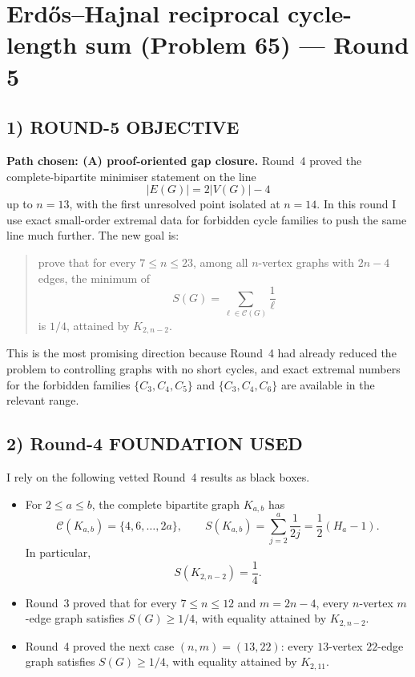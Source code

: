 \section{Erd\H{o}s--Hajnal reciprocal cycle-length sum (Problem 65) --- Round 5}

\subsection*{1) ROUND-5 OBJECTIVE}

\textbf{Path chosen: (A) proof-oriented gap closure.}
Round~4 proved the complete-bipartite minimiser statement on the line
\[
|E(G)|=2|V(G)|-4
\]
up to $n=13$, with the first unresolved point isolated at $n=14$.
In this round I use exact small-order extremal data for forbidden cycle families to push the same line much further.
The new goal is:
\begin{quote}
prove that for every $7\le n\le 23$, among all $n$-vertex graphs with $2n-4$ edges, the minimum of
\[
S(G)=\sum_{\ell\in\mathcal C(G)}\frac1\ell
\]
is $1/4$, attained by $K_{2,n-2}$.
\end{quote}
This is the most promising direction because Round~4 had already reduced the problem to controlling graphs with no short cycles, and exact extremal numbers for the forbidden families $\{C_3,C_4,C_5\}$ and $\{C_3,C_4,C_6\}$ are available in the relevant range.

\subsection*{2) Round-4 FOUNDATION USED}

I rely on the following vetted Round~4 results as black boxes.

\begin{itemize}
\item[(F1)] For $2\le a\le b$, the complete bipartite graph $K_{a,b}$ has
\[
\mathcal C(K_{a,b})=\{4,6,\dots,2a\},
\qquad
S(K_{a,b})=\sum_{j=2}^a\frac1{2j}=\frac12(H_a-1).
\]
In particular,
\[
S(K_{2,n-2})=\frac14.
\]

\item[(F2)] Round~3 proved that for every $7\le n\le 12$ and $m=2n-4$, every $n$-vertex $m$-edge graph satisfies $S(G)\ge 1/4$, with equality attained by $K_{2,n-2}$.

\item[(F3)] Round~4 proved the next case $(n,m)=(13,22)$: every $13$-vertex $22$-edge graph satisfies $S(G)\ge 1/4$, with equality attained by $K_{2,11}$.
\end{itemize}

